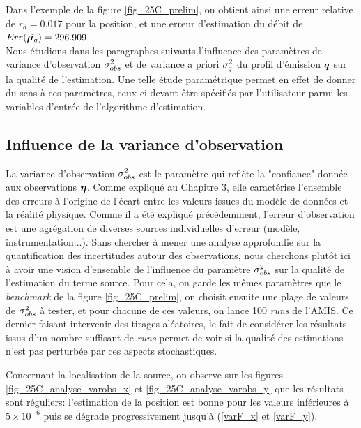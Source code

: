  Dans l'exemple de la figure \ref{fig_25C_prelim}, on obtient ainsi une erreur relative de $r_d = 0.017$ pour la position, et une erreur d'estimation du débit de $Err(\tilde{{\bm{\mu}_q}}) = 296.909$. \\
 
 Nous étudions dans les paragraphes suivants l'influence des paramètres de variance d'observation ${\sigma_{obs}^2}$ et de variance a priori $\sigma_q^2$ du profil d'émission ${\bm{q}}$ sur la qualité de l'estimation. Une telle étude paramétrique permet en effet de donner du sens à ces paramètres, ceux-ci devant être spécifiés par l'utilisateur parmi les variables d'entrée de l'algorithme d'estimation. 
 
 \subsection{Influence de la variance d'observation}
 
 La variance d'observation ${\sigma_{obs}^2}$ est le paramètre qui reflète la "confiance" donnée aux observations ${\bm{\eta}}$. Comme expliqué au Chapitre 3, elle caractérise l'ensemble des erreurs à l'origine de l'écart entre les valeurs issues du modèle de données et la réalité physique. Comme il a été expliqué précédemment, l'erreur d'observation est une agrégation de diverses sources individuelles d'erreur (modèle, instrumentation...). Sans chercher à mener une analyse approfondie sur la quantification des incertitudes autour des observations, nous cherchons plutôt ici à avoir une vision d'ensemble de l'influence du paramètre ${\sigma_{obs}^2}$ sur la qualité de l'estimation du terme source. Pour cela, on garde les mêmes paramètres que le \textit{benchmark} de la figure \ref{fig_25C_prelim}, on choisit ensuite une plage de valeurs de ${\sigma_{obs}^2}$ à tester, et pour chacune de ces valeurs, on lance 100 \textit{runs} de l'AMIS. Ce dernier faisant intervenir des tirages aléatoires, le fait de considérer les résultats issus d'un nombre suffisant de \textit{runs} permet de voir si la qualité des estimations n'est pas perturbée par ces aspects stochastiques. 
   
         Concernant la localisation de la source, on observe sur les figures \ref{fig_25C_analyse_varobs_x} et \ref{fig_25C_analyse_varobs_y} que les résultats sont réguliers: l'estimation de la position est bonne pour les valeurs inférieures à $5\times 10^{-6}$ puis se dégrade progressivement jusqu'à  (\ref{varF_x} et \ref{varF_y}).
         
